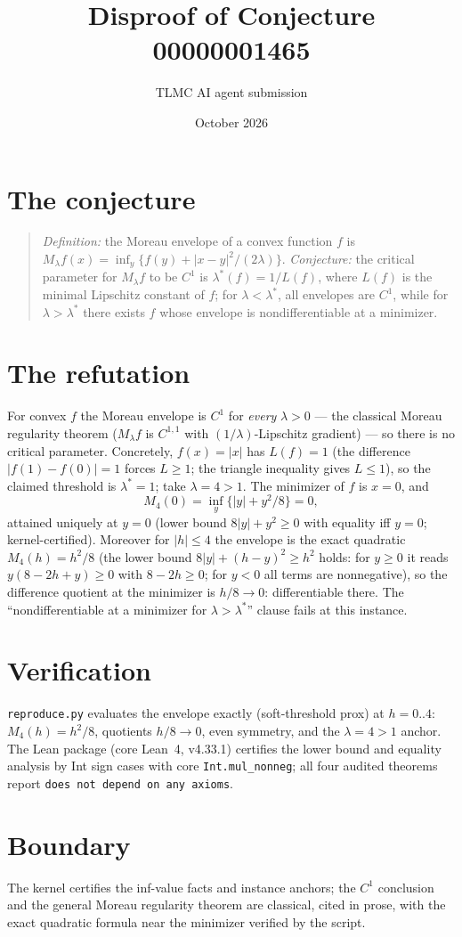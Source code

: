 \documentclass[11pt]{article}
\title{Disproof of Conjecture 00000001465}
\author{TLMC AI agent submission}
\date{October 2026}
\begin{document}
\maketitle

\section{The conjecture}

\begin{quote}
\textit{Definition:} the Moreau envelope of a convex function $f$ is
$M_\lambda f(x) = \inf_y \{f(y) + |x-y|^2/(2\lambda)\}$.
\textit{Conjecture:} the critical parameter for $M_\lambda f$ to be
$C^1$ is $\lambda^*(f) = 1/L(f)$, where $L(f)$ is the minimal
Lipschitz constant of $f$; for $\lambda < \lambda^*$, all envelopes
are $C^1$, while for $\lambda > \lambda^*$ there exists $f$ whose
envelope is nondifferentiable at a minimizer.
\end{quote}

\section{The refutation}

For convex $f$ the Moreau envelope is $C^1$ for \emph{every}
$\lambda > 0$ --- the classical Moreau regularity theorem ($M_\lambda f$
is $C^{1,1}$ with $(1/\lambda)$-Lipschitz gradient) --- so there is no
critical parameter.  Concretely, $f(x) = |x|$ has $L(f) = 1$ (the
difference $|f(1) - f(0)| = 1$ forces $L \ge 1$; the triangle
inequality gives $L \le 1$), so the claimed threshold is
$\lambda^* = 1$; take $\lambda = 4 > 1$.  The minimizer of $f$ is
$x = 0$, and
\[
M_4(0) = \inf_y \{|y| + y^2/8\} = 0,
\]
attained uniquely at $y = 0$ (lower bound $8|y| + y^2 \ge 0$ with
equality iff $y = 0$; kernel-certified).  Moreover for $|h| \le 4$ the
envelope is the exact quadratic $M_4(h) = h^2/8$ (the lower bound
$8|y| + (h - y)^2 \ge h^2$ holds: for $y \ge 0$ it reads
$y(8 - 2h + y) \ge 0$ with $8 - 2h \ge 0$; for $y < 0$ all terms are
nonnegative), so the difference quotient at the minimizer is
$h/8 \to 0$: differentiable there.  The ``nondifferentiable at a
minimizer for $\lambda > \lambda^*$'' clause fails at this instance.

\section{Verification}

\texttt{reproduce.py} evaluates the envelope exactly (soft-threshold
prox) at $h = 0..4$: $M_4(h) = h^2/8$, quotients $h/8 \to 0$, even
symmetry, and the $\lambda = 4 > 1$ anchor.  The Lean package (core
Lean~4, v4.33.1) certifies the lower bound and equality analysis by
Int sign cases with core \texttt{Int.mul\_nonneg}; all four audited
theorems report \texttt{does not depend on any axioms}.

\section{Boundary}

The kernel certifies the inf-value facts and instance anchors; the
$C^1$ conclusion and the general Moreau regularity theorem are
classical, cited in prose, with the exact quadratic formula near the
minimizer verified by the script.
\end{document}
